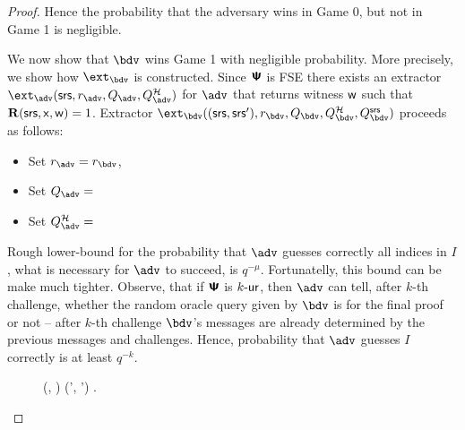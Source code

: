 \documentclass[runningheads,11pt]{llncs}
\begin{document}
\begin{proof}
  Hence the probability that the adversary wins in Game 0, but not in Game 1 is negligible.

  We now show that $\bdv$ wins Game 1 with negligible
  probability. More precisely, we show how $\ext_\bdv$ is constructed.
  Since $\bm{\mathsf{\Psi}}$ is FSE there exists an extractor
  $\ext_\adv(\srs, r_\adv, Q_\adv, Q_\adv^\ro)$ for $\adv$ that
  returns witness $\mathsf{w}$ such that $\mathbf{R}(\mathsf{srs}, \mathsf{x}, \mathsf{w}) = 1$. Extractor 
  $\ext_\bdv ((\srs, \srs'), r_\bdv, Q_\bdv, Q^\ro_\bdv, Q^\srs_\bdv)$
  proceeds as follows:
  \begin{itemize}
  \item Set $r_\adv = r_\bdv$, 
  \item Set $Q_\adv = $
  \item Set $Q_\adv^\ro = $
  \end{itemize}
  
   Rough lower-bound for the probability that $\adv$ guesses correctly all indices in $I$, what is necessary for $\adv$ to succeed, is $q^{-\mu}$. Fortunatelly, this bound can be make much tighter. Observe, that if $\bm{\mathsf{\Psi}}$ is ${k\text{-}\mathsf{ur}}$, then $\adv$ can tell, after $k$-th challenge, whether the random oracle query given by $\bdv$ is for the final proof or not -- after $k$-th challenge $\bdv$'s messages are already determined by the previous messages and challenges. Hence, probability that $\adv$ guesses $I$ correctly is at least $q^{-k}$.



  \begin{figure}
\centering
	\begin{pcvstack}
		\begin{pchstack}
			{
        \pcreturn (\inp, \wit) \gets (\inp', \wit') \cdot \alpha.
      }

		\end{pchstack}
    

\end{pcvstack}
\end{figure}
\end{proof}
\end{document}
